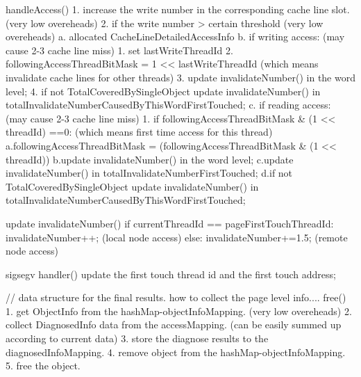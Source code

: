         handleAccess(){
            1. increase the write number in the corresponding cache line slot.  (very low overeheads)
            2. if the write number > certain threshold                          (very low overeheads)
                      a. allocated CacheLineDetailedAccessInfo
                      b. if writing access:                  (may cause 2-3 cache line miss)
                            1. set lastWriteThreadId
                            2. followingAccessThreadBitMask = 1 << lastWriteThreadId (which means invalidate cache lines for other threads)
                            3. update invalidateNumber() in the word level;
                            4. if not TotalCoveredBySingleObject
                                    update invalidateNumber() in totalInvalidateNumberCausedByThisWordFirstTouched;
                      c. if reading access:                   (may cause 2-3 cache line miss)
                            1. if followingAccessThreadBitMask & (1 << threadId) ==0: (which means first time access for this thread)
                                    a.followingAccessThreadBitMask = (followingAccessThreadBitMask & (1 << threadId))
                                    b.update invalidateNumber() in the word level;
                                    c.update invalidateNumber() in totalInvalidateNumberFirstTouched;
                                    d.if not TotalCoveredBySingleObject
                                            update invalidateNumber() in totalInvalidateNumberCausedByThisWordFirstTouched;
        }

        update invalidateNumber(){
            if currentThreadId == pageFirstTouchThreadId:
                    invalidateNumber++;    (local node access)
            else:
                    invalidateNumber+=1.5;  (remote node access)
        }

        sigsegv handler() {
            update the first touch thread id and the first touch address;
        }

        // data structure for the final results. how to collect the page level info....
        free() {
        1. get ObjectInfo from the hashMap-objectInfoMapping. (very low overeheads)
        2. collect DiagnosedInfo data from the accessMapping. (can be easily summed up according to current data)
        3. store the diagnose results to the diagnosedInfoMapping.
        4. remove object from the hashMap-objectInfoMapping.
        5. free the object.
        }
